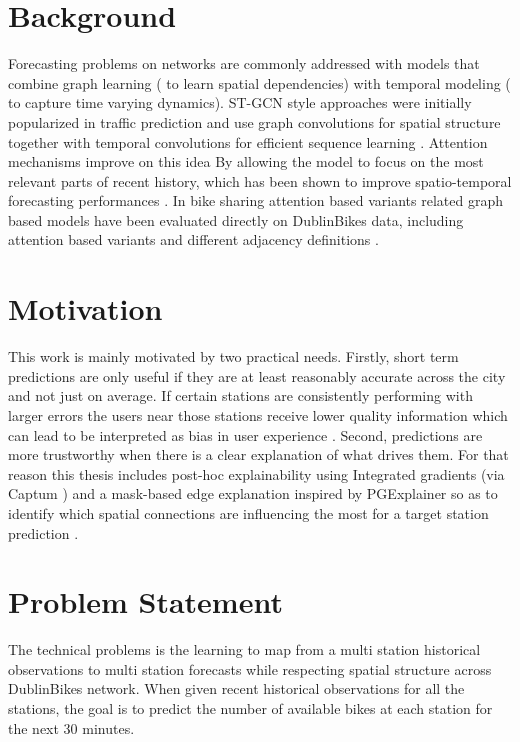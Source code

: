 \documentclass[11pt]{report}
\begin{document}
\section{Background}
Forecasting problems on networks are commonly addressed with models that combine graph learning ( to learn spatial dependencies) with temporal modeling ( to capture time varying dynamics). ST-GCN style approaches were initially popularized in traffic prediction and use graph convolutions for spatial structure together with temporal convolutions for efficient sequence learning \cite{yu2018stgcn}. Attention mechanisms improve on this idea By allowing the model to focus on the most relevant parts of recent history, which has been shown to improve spatio-temporal forecasting performances \cite{guo2019astgcn}.  In bike sharing attention based variants related graph based models have been evaluated directly on DublinBikes data, including attention based variants and different adjacency definitions \cite{chen2021comparative}.


\section{Motivation}
This work is mainly motivated by two practical needs. Firstly, short term predictions are only useful if they are at least reasonably accurate across the city and not just on average. If certain stations are consistently performing with larger errors the users near those stations receive lower quality information which can lead to be interpreted as bias in user experience \cite{yan2020fairness,zheng2021equality}. Second, predictions are more trustworthy when there is a clear explanation of what drives them. For that reason this thesis includes post-hoc explainability using Integrated gradients \cite{sundararajan2017ig} (via Captum \cite{captum_website}) and a mask-based edge explanation inspired by PGExplainer so as to identify which spatial connections are influencing the most for a target station prediction \cite{luo2020pgexplainer}.


\section{Problem Statement}
The technical problems is the learning to map from a multi station historical observations to multi station forecasts while respecting spatial structure across DublinBikes network. When given recent historical observations for all the stations, the goal is to predict the number of available bikes at each station for the next 30 minutes. 
\end{document}
